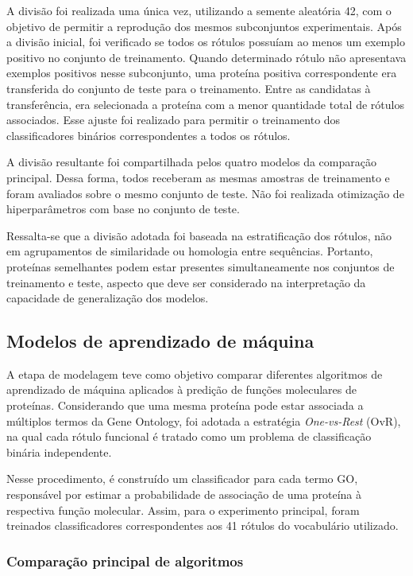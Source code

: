 A divisão foi realizada uma única vez, utilizando a semente aleatória 42, com o objetivo de permitir a reprodução dos mesmos subconjuntos experimentais. Após a divisão inicial, foi verificado se todos os rótulos possuíam ao menos um exemplo positivo no conjunto de treinamento. Quando determinado rótulo não apresentava exemplos positivos nesse subconjunto, uma proteína positiva correspondente era transferida do conjunto de teste para o treinamento. Entre as candidatas à transferência, era selecionada a proteína com a menor quantidade total de rótulos associados. Esse ajuste foi realizado para permitir o treinamento dos classificadores binários correspondentes a todos os rótulos.

A divisão resultante foi compartilhada pelos quatro modelos da comparação principal. Dessa forma, todos receberam as mesmas amostras de treinamento e foram avaliados sobre o mesmo conjunto de teste. Não foi realizada otimização de hiperparâmetros com base no conjunto de teste.

Ressalta-se que a divisão adotada foi baseada na estratificação dos rótulos, não em agrupamentos de similaridade ou homologia entre sequências. Portanto, proteínas semelhantes podem estar presentes simultaneamente nos conjuntos de treinamento e teste, aspecto que deve ser considerado na interpretação da capacidade de generalização dos modelos.


\subsection{Modelos de aprendizado de máquina}
\label{subsec:modelos}

A etapa de modelagem teve como objetivo comparar diferentes algoritmos de aprendizado de máquina aplicados à predição de funções moleculares de proteínas. Considerando que uma mesma proteína pode estar associada a múltiplos termos da Gene Ontology, foi adotada a estratégia \textit{One-vs-Rest} (OvR), na qual cada rótulo funcional é tratado como um problema de classificação binária independente.

Nesse procedimento, é construído um classificador para cada termo GO, responsável por estimar a probabilidade de associação de uma proteína à respectiva função molecular. Assim, para o experimento principal, foram treinados classificadores correspondentes aos 41 rótulos do vocabulário utilizado.

\subsubsection{Comparação principal de algoritmos}

